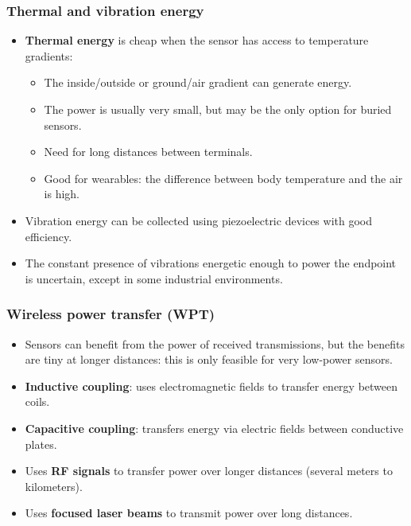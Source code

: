 \subsubsection{Thermal and vibration energy}
\begin{itemize}
    \item \textbf{Thermal energy} is cheap when the sensor has access to temperature gradients:
    \begin{itemize}
        \item The inside/outside or ground/air gradient can generate energy.
        \item The power is usually very small, but may be the only option for buried sensors.
        \item Need for long distances between terminals.
        \item Good for wearables: the difference between body temperature and the air is high.
    \end{itemize}
    \item Vibration energy can be collected using piezoelectric devices with good efficiency.
    \item The constant presence of vibrations energetic enough to power the endpoint is uncertain, except in some industrial environments.
\end{itemize}

\subsubsection{Wireless power transfer (WPT)}
\begin{itemize}
    \item Sensors can benefit from the power of received transmissions, but the benefits are tiny at longer distances: this is only feasible for very low-power sensors.
    \item \textbf{Inductive coupling}: uses electromagnetic fields to transfer energy between coils.
    \item \textbf{Capacitive coupling}: transfers energy via electric fields between conductive plates.
    \item Uses \textbf{RF signals} to transfer power over longer distances (several meters to kilometers).
    \item Uses \textbf{focused laser beams} to transmit power over long distances.
\end{itemize}

